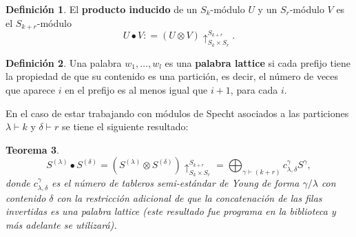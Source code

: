 \documentclass[12pt]{book}
\newtheorem{theorem}{Teorema}[section]
\theoremstyle{definition}
\newtheorem{definition}[theorem]{Definición}
\newcounter{in}
\newcounter{ini}
\begin{document}
\begin{definition}
\label{ind_prod}
El \textbf{producto inducido} de un $S_k$-módulo $U$ y un $S_r$-módulo $V$ es
el $S_{k + r}$-módulo
$$U \bullet V \colon = (U \otimes V) \uparrow^{S_{k + r}}_{S_{k} \times S_{r}}.$$
\end{definition}
\begin{definition}
Una palabra $w_{1},\ldots,w_{l}$ es una \textbf{palabra lattice} si
cada prefijo tiene la propiedad de que su contenido es una partición,
es decir, el número de veces que aparece $i$ en el prefijo es al menos
igual que $i + 1$, para cada $i$. 
\end{definition}
En el caso de estar trabajando con
módulos de Specht asociados a las particiones $\lambda \vdash k$ y
$\delta \vdash r$ se tiene el siguiente resultado:
\begin{theorem}
$$S^{(\lambda)} \bullet S^{(\delta)} = (S^{(\lambda)} \otimes S^{(\delta)}) \uparrow^{S_{k+r}}_{S_{k} \times S_{r}} = \bigoplus_{\gamma \vdash  (k + r)} c_{\lambda,\delta}^{\gamma}S^{\gamma},$$
donde $c_{\lambda,\delta}^{\gamma}$ es el número de tableros
semi-estándar de Young de forma $\gamma / \lambda$ con contenido
$\delta$ con la restricción adicional de que la concatenación de las
filas invertidas es una palabra lattice (este resultado fue programa
en la biblioteca y más adelante se utilizará).
\end{theorem}
\end{document}
